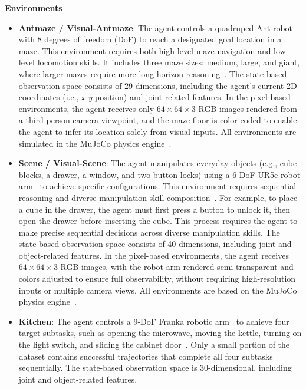 \documentclass{article}
\begin{document}
\noindent\textbf{Environments}
\begin{itemize}[leftmargin=1.0em, itemsep=0.5em, topsep=1.5pt]
    \item \textbf{Antmaze / Visual-Antmaze}: The agent controls a quadruped Ant robot~\cite{brockman2016gym} with 8 degrees of freedom (DoF) to reach a designated goal location in a maze. This environment requires both high-level maze navigation and low-level locomotion skills. It includes three maze sizes: medium, large, and giant, where larger mazes require more long-horizon reasoning~\cite{park2025ogbench}. The state-based observation space consists of 29 dimensions, including the agent's current 2D coordinates (i.e., \textit{x-y} position) and joint-related features. In the pixel-based environments, the agent receives only $64{\times}64{\times}3$ RGB images rendered from a third-person camera viewpoint, and the maze floor is color-coded to enable the agent to infer its location solely from visual inputs. All environments are simulated in the MuJoCo physics engine~\cite{todorov2012mujoco}.

    \item \textbf{Scene / Visual-Scene}: The agent manipulates everyday objects (e.g., cube blocks, a drawer, a window, and two button locks) using a 6-DoF UR5e robot arm~\cite{zakka2022mujoco} to achieve specific configurations. This environment requires sequential reasoning and diverse manipulation skill composition~\cite{park2025ogbench}. For example, to place a cube in the drawer, the agent must first press a button to unlock it, then open the drawer before inserting the cube. This process requires the agent to make precise sequential decisions across diverse manipulation skills. The state-based observation space consists of 40 dimensions, including joint and object-related features. In the pixel-based environments, the agent receives $64{\times}64{\times}3$ RGB images, with the robot arm rendered semi-transparent and colors adjusted to ensure full observability, without requiring high-resolution inputs or multiple camera views. All environments are based on the MuJoCo physics engine~\cite{todorov2012mujoco}.

    \item \textbf{Kitchen}: The agent controls a 9-DoF Franka robotic arm~\cite{gupta2020relay} to achieve four target subtasks, such as opening the microwave, moving the kettle, turning on the light switch, and sliding the cabinet door~\cite{fu2020d4rl}. Only a small portion of the dataset contains successful trajectories that complete all four subtasks sequentially. The state-based observation space is 30-dimensional, including  joint and object-related features. 
\end{itemize}
\end{document}
